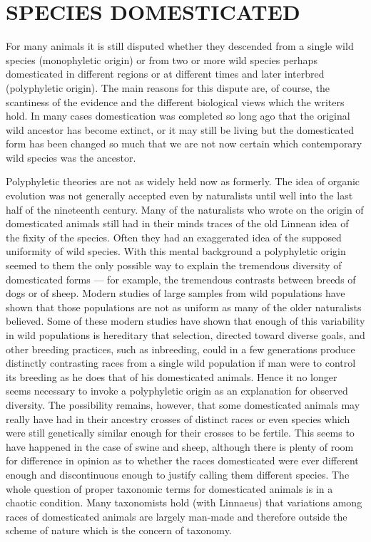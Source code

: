 \section*{SPECIES DOMESTICATED}

For many animals it is still disputed whether they descended from a single wild species (monophyletic origin) or
from two or more wild species perhaps domesticated in different regions or at different times and later interbred
(polyphyletic origin). The main reasons for this dispute are, of course, the scantiness of the evidence and the
different biological views which the writers hold. In many cases domestication was completed so long ago that the
original wild ancestor has become extinct, or it may still be living but the domesticated form has been changed so
much that we are not now certain which contemporary wild species was the ancestor.

Polyphyletic theories are not as widely held now as formerly. The idea of organic evolution was not generally
accepted even by naturalists until well into the last half of the nineteenth century. Many of the naturalists
who wrote on the origin of domesticated animals still had in their minds traces of the old Linnean idea of the
fixity of the species. Often they had an exaggerated idea of the supposed uniformity of wild species. With this
mental background a polyphyletic origin seemed to them the only possible way to explain the tremendous diversity
of domesticated forms --- for example, the tremendous contrasts between breeds of dogs or of sheep. Modern studies
of large samples from wild populations have shown that those populations are not as uniform as many of the older
naturalists believed. Some of these modern studies have shown that enough of this variability in wild populations
is hereditary that selection, directed toward diverse goals, and other breeding practices, such as inbreeding,
could in a few generations produce distinctly contrasting races from a single wild population if man were to
control its breeding as he does that of his domesticated animals. Hence it no longer seems necessary to invoke
a polyphyletic origin as an explanation for observed diversity. The possibility remains, however, that some
domesticated animals may really have had in their ancestry crosses of distinct races or even species which were
still genetically similar enough for their crosses to be fertile. This seems to have happened in the case of
swine and sheep, although there is plenty of room for difference in opinion as to whether the races domesticated
were ever different enough and discontinuous enough to justify calling them different species. The whole question
of proper taxonomic terms for domesticated animals is in a chaotic condition. Many taxonomists hold (with
Linnaeus) that variations among races of domesticated animals are largely man-made and therefore outside the
scheme of nature which is the concern of taxonomy.

